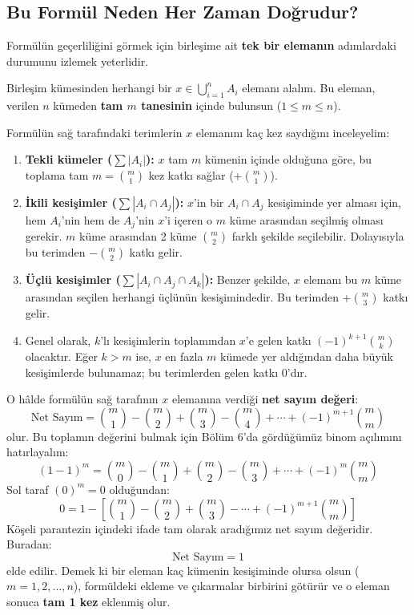 \subsection{Bu Formül Neden Her Zaman Doğrudur?}

Formülün geçerliliğini görmek için birleşime ait \textbf{tek bir elemanın}
adımlardaki durumunu izlemek yeterlidir.

Birleşim kümesinden herhangi bir $x \in \bigcup_{i=1}^n A_i$ elemanı alalım. Bu
eleman, verilen $n$ kümeden \textbf{tam $m$ tanesinin} içinde bulunsun
($1 \le m \le n$).

Formülün sağ tarafındaki terimlerin $x$ elemanını kaç kez saydığını inceleyelim:
\begin{enumerate} \item \textbf{Tekli kümeler ($\sum |A_i|$):} $x$ tam $m$ kümenin
içinde olduğuna göre, bu toplama tam $m = \binom{m}{1}$ kez katkı sağlar
($+ \binom{m}{1}$). \item \textbf{İkili kesişimler ($\sum |A_i \cap A_j|$):}
$x$'in bir $A_i \cap A_j$ kesişiminde yer alması için, hem $A_i$'nin hem de
$A_j$'nin $x$'i içeren o $m$ küme arasından seçilmiş olması gerekir. $m$ küme
arasından 2 küme $\binom{m}{2}$ farklı şekilde seçilebilir. Dolayısıyla bu
terimden $-\binom{m}{2}$ katkı gelir. \item \textbf{Üçlü kesişimler
($\sum |A_i \cap A_j \cap A_k|$):} Benzer şekilde, $x$ elemanı bu $m$ küme
arasından seçilen herhangi üçlünün kesişimindedir. Bu terimden $+\binom{m}{3}$
katkı gelir. \item Genel olarak, $k$'lı kesişimlerin toplamından $x$'e gelen
katkı $(-1)^{k+1}\binom{m}{k}$ olacaktır. Eğer $k > m$ ise, $x$ en fazla $m$
kümede yer aldığından daha büyük kesişimlerde bulunamaz; bu terimlerden gelen
katkı 0'dır. \end{enumerate}

O hâlde formülün sağ tarafının $x$ elemanına verdiği \textbf{net sayım değeri}:
\[ \text{Net Sayım} = \binom{m}{1} - \binom{m}{2} + \binom{m}{3} - \binom{m}{4} +
\cdots + (-1)^{m+1}\binom{m}{m} \] olur. Bu toplamın değerini bulmak için
Bölüm 6'da gördüğümüz binom açılımını hatırlayalım: \[ (1 - 1)^m = \binom{m}{0}
- \binom{m}{1} + \binom{m}{2} - \binom{m}{3} + \cdots + (-1)^m \binom{m}{m} \] Sol
taraf $(0)^m = 0$ olduğundan: \[ 0 = 1 - \left[ \binom{m}{1} - \binom{m}{2} +
\binom{m}{3} - \cdots + (-1)^{m+1}\binom{m}{m} \right] \] Köşeli parantezin
içindeki ifade tam olarak aradığımız net sayım değeridir. Buradan: \[ \text{Net
Sayım} = 1 \] elde edilir. Demek ki bir eleman kaç kümenin kesişiminde olursa
olsun ($m=1, 2, \dots, n$), formüldeki ekleme ve çıkarmalar birbirini götürür ve
o eleman sonuca \textbf{tam 1 kez} eklenmiş olur.

